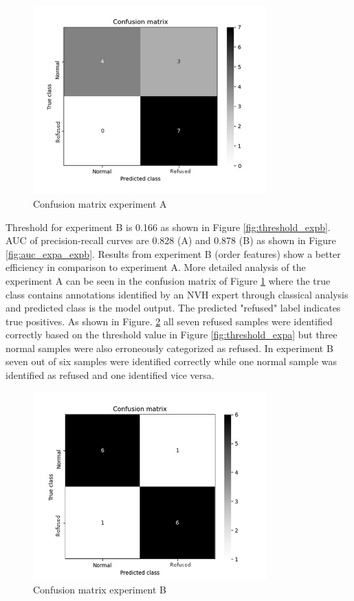 \documentclass[a4paper, 10pt, twocolumn]{article}
\begin{document}
\begin{figure}[hbt]
\begin{center}
    

\includegraphics[width=9cm]{conf_matrix_stft.png}
\end{center}
\caption{Confusion matrix experiment A}
\label{fig:conf_matrix_expa}
\end{figure}
Threshold for experiment B is 0.166 as shown in Figure \ref{fig:threshold_expb}. AUC of precision-recall curves are 0.828 (A) and 0.878 (B) as shown in Figure \ref{fig:auc_expa_expb}. Results from experiment B (order features) show a better efficiency in comparison to experiment A. More detailed analysis of the experiment A can be seen in the confusion matrix of Figure \ref{fig:conf_matrix_expa} where the true class contains annotations identified by an NVH expert through classical analysis and predicted class is the model output. The predicted "refused" label indicates true positives. As shown in Figure. \ref{fig:conf_matrix_expb} all seven refused samples were identified correctly based on the threshold value in Figure \ref{fig:threshold_expa} but three normal samples were also erroneously categorized as refused. In experiment B seven out of six samples were identified correctly while one normal sample was identified as refused and one identified vice versa.    

\begin{figure}[hbt]
\begin{center}
\includegraphics[width=9cm]{conf_matrix_order.png}
\end{center}
\caption{Confusion matrix experiment B}
\label{fig:conf_matrix_expb}
\end{figure}
\FloatBarrier
\end{document}
